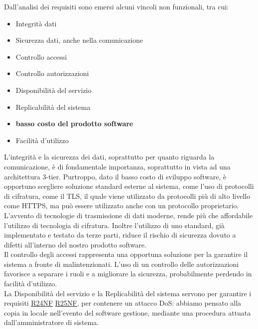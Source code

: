 \documentclass[a4paper]{article}
\begin{document}
Dall’analisi dei requisiti sono emersi alcuni vincoli non funzionali, tra cui:

\begin{itemize}
    \item Integrità dati
    \item Sicurezza dati, anche nella comunicazione
    \item Controllo accessi
    \item Controllo autorizzazioni
    \item Disponibilità del servizio
    \item Replicabilità del sistema
    \item \textbf{basso costo del prodotto software}
    \item Facilità d’utilizzo
\end{itemize}

L'integrità e la sicurezza dei dati, soprattutto per quanto riguarda la comunicazione, è di fondamentale importanza, soprattutto in vista ad una architettura 3-tier. Purtroppo, dato il basso costo di sviluppo software, è opportuno scegliere soluzione standard esterne al sistema, come l'uso di protocolli di cifratura, come il TLS, il quale viene utilizzato da protocolli più di alto livello come HTTPS, ma può essere utilizzato anche con un protocollo proprietario. L'avvento di tecnologie di trasmissione di dati moderne, rende più che affordabile l'utilizzo di tecnologia di cifratura. Inoltre l'utilizzo di uno standard, già implementato e testato da terze parti, riduce il rischio di sicurezza dovuto a difetti all'interno del nostro prodotto software.\\Il controllo degli accessi rappresenta una opportuna soluzione per la garantire il sistema a fronte di malintenzionati. L'uso di un controllo delle autorizzazioni favorisce a separare i ruoli e a migliorare la sicurezza, probabilmente perdendo in facilità d'utilizzo.\\La Disponibilità del servizio e la Replicabilità del sistema servono per garantire i requisiti \hyperlink{R24NF}{R24NF} \hyperlink{R25NF}{R25NF}, per contenere un attacco DoS: abbiamo pensato alla copia in locale nell'evento del software gestione, mediante una procedura attuata dall'amministratore di sistema.
\end{document}
